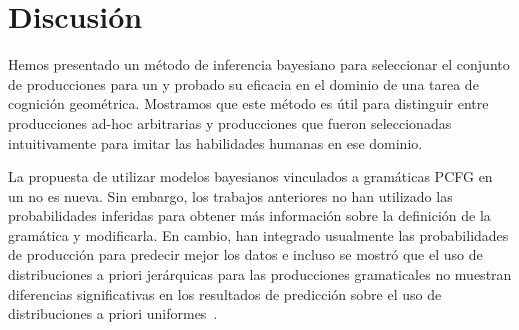 \section{Discusión}


Hemos presentado un método de inferencia bayesiano para seleccionar el conjunto de producciones para un \lot y probado su eficacia en el dominio de una tarea de cognición geométrica. Mostramos que este método es útil para distinguir entre producciones ad-hoc arbitrarias y producciones que fueron seleccionadas intuitivamente para imitar las habilidades humanas en ese dominio.


La propuesta de utilizar modelos bayesianos vinculados a gramáticas PCFG en un \lot no es nueva. Sin embargo, los trabajos anteriores no han utilizado las probabilidades inferidas para obtener más información sobre la definición de la gramática y modificarla. En cambio, han integrado usualmente las probabilidades de producción para predecir mejor los datos e incluso se mostró que el uso de distribuciones a priori jerárquicas para las producciones gramaticales no muestran diferencias significativas en los resultados de predicción sobre el uso de distribuciones a priori uniformes~\cite{piantadosi2012bootstrapping,yildirim2015learning}.


